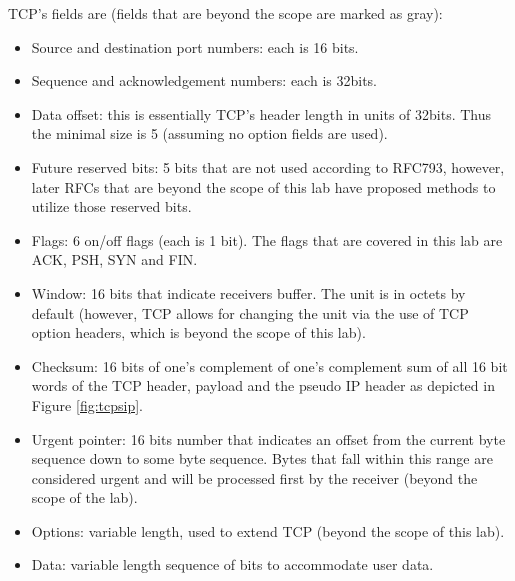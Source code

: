 \documentclass[pdftex,12pt,a4paper]{article}
\begin{document}
                TCP's fields are (fields that are beyond the scope are marked as
                gray):
                \begin{itemize}
                    \item Source and destination port numbers: each is 16 bits.
                    \item Sequence and acknowledgement numbers: each is 32bits.
                    \item Data offset: this is essentially TCP's header length in units
                        of 32bits. Thus the minimal size is 5 (assuming no option
                        fields are used).
                    \item Future reserved bits: 5 bits that are not used according
                        to RFC793, however, later RFCs that are beyond the scope of
                        this lab have proposed methods to utilize those reserved
                        bits.
                    \item Flags: 6 on/off flags (each is 1 bit). The flags that are
                        covered in this lab are ACK, PSH, SYN and FIN.
                    \item Window: 16 bits that indicate receivers buffer. The unit
                        is in octets by default (however, TCP allows for changing
                        the unit via the use of TCP option headers, which is beyond
                        the scope of this lab).
                    \item Checksum: 16 bits of one's complement of one's complement
                        sum of all 16 bit words of the TCP header, payload and the pseudo IP header
                        as depicted in Figure \ref{fig:tcpsip}.
                    \item {\color{gray}Urgent pointer: 16 bits number that indicates an offset
                        from the current byte sequence down to some byte
                        sequence. Bytes that fall within this range are considered
                        urgent and will be processed first by the receiver
                        (beyond the scope of the lab).}
                    \item {\color{gray} Options: variable length, used to extend TCP (beyond the
                        scope of this lab).}
                    \item Data: variable length sequence of bits to accommodate
                        user data.
                \end{itemize}
\end{document}
